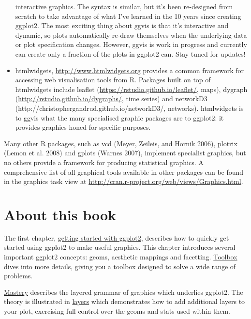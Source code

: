 \begin{itemize}
  interactive graphics. The syntax is similar, but it's been re-designed
  from scratch to take advantage of what I've learned in the 10 years
  since creating ggplot2. The most exciting thing about ggvis is that
  it's interactive and dynamic, so plots automatically re-draw
  themselves when the underlying data or plot specification changes.
  However, ggvis is work in progress and currently can create only a
  fraction of the plots in ggplot2 can. Stay tuned for updates!
\item
  htmlwidgets, \url{http://www.htmlwidgets.org} provides a common
  framework for accessing web visualisation tools from R. Packages built
  on top of htmlwidgets include leaflet
  (\url{https://rstudio.github.io/leaflet/}, maps), dygraph
  (\url{http://rstudio.github.io/dygraphs/}, time series) and networkD3
  (http://christophergandrud.github.io/networkD3/, networks).
  htmlwidgets is to ggvis what the many specialised graphic packages are
  to ggplot2: it provides graphics honed for specific purposes.
\end{itemize}

Many other R packages, such as vcd (Meyer, Zeileis, and Hornik 2006),
plotrix (Lemon et al. 2008) and gplots (Warnes 2007), implement
specialist graphics, but no others provide a framework for producing
statistical graphics. A comprehensive list of all graphical tools
available in other packages can be found in the graphics task view at
\url{http://cran.r-project.org/web/views/Graphics.html}.

\section{About this book}\label{about-this-book}

The first chapter, \protect\hyperlink{cha:getting-started}{getting
started with ggplot2}, describes how to quickly get started using
ggplot2 to make useful graphics. This chapter introduces several
important ggplot2 concepts: geoms, aesthetic mappings and facetting.
\protect\hyperlink{cha:toolbox}{Toolbox} dives into more details, giving
you a toolbox designed to solve a wide range of problems.

\protect\hyperlink{cha:mastery}{Mastery} describes the layered grammar
of graphics which underlies ggplot2. The theory is illustrated in
\protect\hyperlink{cha:layers}{layers} which demonstrates how to add
additional layers to your plot, exercising full control over the geoms
and stats used within them.

